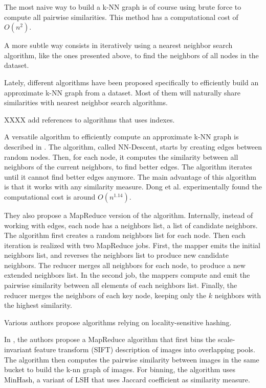 \documentclass[wcp]{jmlr}
\begin{document}
The most naive way to build a k-NN graph is of course using brute force to compute all pairwise similarities. This method has a computational cost of $O(n^2)$.

A more subtle way consists in iteratively using a nearest neighbor search algorithm, like the ones presented above, to find the neighbors of all nodes in the dataset.

Lately, different algorithms have been proposed specifically to efficiently build an approximate k-NN graph from a dataset. Most of them will naturally share similarities with nearest neighbor search algorithms.

XXXX add references to algorithms that uses indexes.

A versatile algorithm to efficiently compute an approximate k-NN graph is described in \cite{Dong2011}. The algorithm, called NN-Descent, starts by creating edges between random nodes. Then, for each node, it computes the similarity between all neighbors of the current neighbors, to find better edges. The algorithm iterates until it cannot find better edges anymore. The main advantage of this algorithm is that it works with any similarity measure. Dong et al. experimentally found the computational cost is around $O(n^{1.14})$.

They also propose a MapReduce version of the algorithm. Internally, instead of working with edges, each node has a neighbors list, a list of candidate neighbors. The algorithm first creates a random neighbors list for each node. Then each iteration is realized with two MapReduce jobs. First, the mapper emits the initial neighbors list, and reverses the neighbors list to produce new candidate neighbors. The reducer merges all neighbors for each node, to produce a new extended neighbors list. In the second job, the mappers compute and emit the pairwise similarity between all elements of each neighbors list. Finally, the reducer merges the neighbors of each key node, keeping only the $k$ neighbors with the highest similarity.

Various authors propose algorithms relying on locality-sensitive hashing.

In \cite{Hsieh2012}, the authors propose a MapReduce algorithm that first bins the scale-invariant feature transform (SIFT) description of images into overlapping pools. The algorithm then computes the pairwise similarity between images in the same bucket to build the k-nn graph of images. For binning, the algorithm uses MinHash, a variant of LSH that uses Jaccard coefficient as similarity measure.
\end{document}

